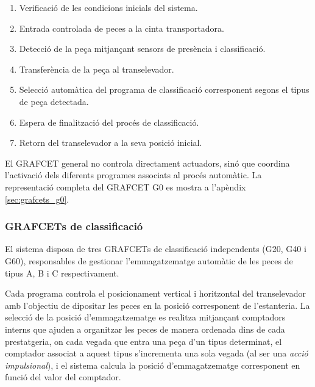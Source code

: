 \documentclass[a4paper,11pt,DIV=13,headings=normal,abstract=true,twoside=semi]{article}
\newcommand{\acro}[1]{\textsc{#1}}
\begin{document}
\begin{enumerate}

\item Verificació de les condicions inicials del sistema.

\item Entrada controlada de peces a la cinta transportadora.

\item Detecció de la peça mitjançant sensors de presència i classificació.

\item Transferència de la peça al transelevador.

\item Selecció automàtica del programa de classificació corresponent segons el tipus de peça detectada.

\item Espera de finalització del procés de classificació.

\item Retorn del transelevador a la seva posició inicial.

\end{enumerate}

El \acro{GRAFCET} general no controla directament actuadors, sinó que coordina l'activació dels diferents programes associats al procés automàtic. La representació completa del \acro{GRAFCET} G0 es mostra a l'apèndix \ref{sec:grafcets_g0}.

\subsubsection{\acro{GRAFCET}s de classificació}

El sistema disposa de tres \acro{GRAFCET}s de classificació independents (G20, G40 i G60), responsables de gestionar l'emmagatzematge automàtic de les peces de tipus A, B i C respectivament.

Cada programa controla el posicionament vertical i horitzontal del transelevador amb l'objectiu de dipositar les peces en la posició corresponent de l'estanteria.  La selecció de la posició d'emmagatzematge es realitza mitjançant comptadors interns que ajuden a organitzar les peces de manera ordenada dins de cada prestatgeria, on cada vegada que entra una peça d'un tipus determinat, el comptador associat a aquest tipus s'incrementa una sola vegada (al ser una \emph{acció impulsional}), i el sistema calcula la posició d'emmagatzematge corresponent en funció del valor del comptador.
\end{document}
